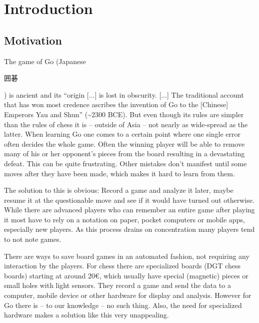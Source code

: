 
\chapter{Introduction}
	\section{Motivation}
	\label{introduction-motivation}
	The game of Go (Japanese \begingroup\setmainfont{Droid Sans Japanese}\small\begin{CJK}{UTF8}{min}囲碁\end{CJK}\endgroup ) is ancient and its ``origin [...] is lost in obscurity. [...] The traditional account that has won most credence ascribes the invention of Go to the [Chinese] Emperors Yau and Shun''\cite{mihori1939japanese} (\textasciitilde 2300 BCE). But even though its rules are simpler than the rules of chess it is -- outside of Asia -- not nearly as wide-spread as the latter. When learning Go one comes to a certain point where one single error often decides the whole game. Often the winning player will be able to remove many of his or her opponent's pieces from the board resulting in a devastating defeat. This can be quite frustrating. Other mistakes don't manifest until some moves after they have been made, which makes it hard to learn from them.

	The solution to this is obvious: Record a game and analyze it later, maybe resume it at the questionable move and see if it would have turned out otherwise. While there are advanced players who can remember an entire game after playing it most have to rely on a notation on paper, pocket computers or mobile apps, especially new players. As this process drains on concentration many players tend to not note games.

	There are ways to save board games in an automated fashion, not requiring any interaction by the players. For chess there are specialized boards (DGT chess boards) starting at around 20€, which usually have special (magnetic) pieces\cite{bulsink2001device} or small holes with light sensors. They record a game and send the data to a computer, mobile device or other hardware for display and analysis. However for Go there is -- to our knowledge -- no such thing. Also, the need for specialized hardware makes a solution like this very unappealing.

